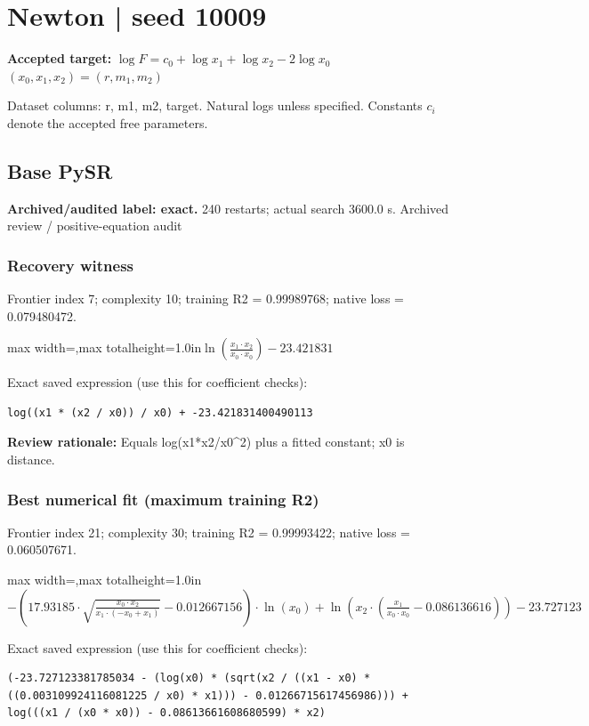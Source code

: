 \documentclass[10pt,letterpaper,landscape]{article}
\begin{document}
\section*{Newton | seed 10009}
\textbf{Accepted target:} $\displaystyle \log F=c_0+\log x_1+\log x_2-2\log x_0$\hfill $(x_0,x_1,x_2)=(r,m_1,m_2)$\par
{\small Dataset columns: r, m1, m2, target. Natural logs unless specified. Constants $c_i$ denote the accepted free parameters.}\par\medskip
\begin{minipage}[t]{0.485\textwidth}
\subsection*{Base PySR}
\textbf{Archived/audited label: exact.} 240 restarts; actual search 3600.0 s.
{\small Archived review / positive-equation audit}
\subsubsection*{Recovery witness}
Frontier index 7; complexity 10; training R2 = 0.99989768; native loss = 0.079480472.
\begin{center}\begin{adjustbox}{max width=\linewidth,max totalheight=1.0in}$\displaystyle \ln{\left(\frac{x_{1} \cdot x_{2}}{x_{0} \cdot x_{0}} \right)} - 23.421831$\end{adjustbox}\end{center}
{\scriptsize Exact saved expression (use this for coefficient checks):}
\begin{lstlisting}
log((x1 * (x2 / x0)) / x0) + -23.421831400490113
\end{lstlisting}
{\small\textbf{Review rationale:} Equals log(x1*x2/x0\textasciicircum{}2) plus a fitted constant; x0 is distance.}
\subsubsection*{Best numerical fit (maximum training R2)}
Frontier index 21; complexity 30; training R2 = 0.99993422; native loss = 0.060507671.
\begin{center}\begin{adjustbox}{max width=\linewidth,max totalheight=1.0in}$\displaystyle - \left(17.93185 \cdot \sqrt{\frac{x_{0} \cdot x_{2}}{x_{1} \cdot \left(- x_{0} + x_{1}\right)}} - 0.012667156\right) \cdot \ln{\left(x_{0} \right)} + \ln{\left(x_{2} \cdot \left(\frac{x_{1}}{x_{0} \cdot x_{0}} - 0.086136616\right) \right)} - 23.727123$\end{adjustbox}\end{center}
{\scriptsize Exact saved expression (use this for coefficient checks):}
\begin{lstlisting}
(-23.727123381785034 - (log(x0) * (sqrt(x2 / ((x1 - x0) * ((0.003109924116081225 / x0) * x1))) - 0.01266715617456986))) + log(((x1 / (x0 * x0)) - 0.08613661608680599) * x2)
\end{lstlisting}
\end{minipage}\hfill
\end{document}
